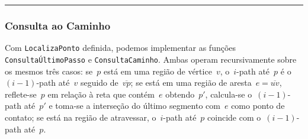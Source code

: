 \documentclass[11pt]{article}
\newcounter{algorithmref}
\newcommand{\alglabel}[1]{\refstepcounter{algorithmref}\label{#1}}
\begin{document}
\begin{algorithm}[h!]
\alglabel{alg:locate_point}
\caption{Localiza Ponto}
\vspace{0.3em}\hrule\vspace{0.3em}
\end{algorithm}

\subsubsection{Consulta ao Caminho}
\label{sec:query}

Com \texttt{LocalizaPonto} definida, podemos implementar as funções \texttt{ConsultaÚltimoPasso} e \texttt{ConsultaCaminho}. Ambas operam recursivamente sobre os mesmos três casos: se~\(p\) está em uma região de vértice~\(v\), o~\(i\)-path até~\(p\) é o~\((i-1)\)-path até~\(v\) seguido de~\(\overline{vp}\); se está em uma região de aresta~\(e = \overline{uv}\), reflete-se~\(p\) em relação à reta que contém~\(e\) obtendo~\(p'\), calcula-se o~\((i-1)\)-path até~\(p'\) e toma-se a interseção do último segmento com~\(e\) como ponto de contato; se está na região de atravessar, o~\(i\)-path até~\(p\) coincide com o~\((i-1)\)-path até~\(p\).
\end{document}
